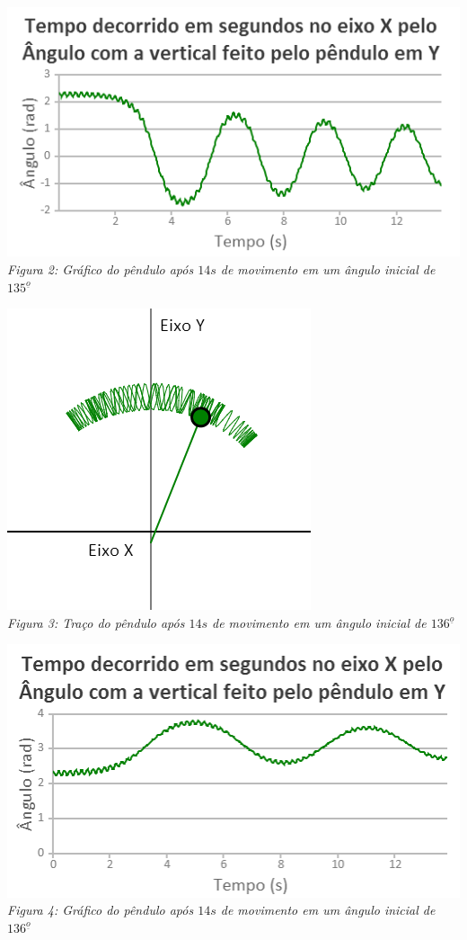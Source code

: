 \documentclass[13pt,a4paper]{report}
\begin{document}
\begin{center}
\includegraphics[scale=0.9]{figuras/graficopenduloimpulsionado135.png}
\\
\textit{Figura 2: Gráfico do pêndulo após $14 s$ de movimento em um ângulo inicial
de $135^{\underline{o}}$ }
\end{center}

\begin{center}
\includegraphics[scale=0.9]{figuras/tracopenduloimpulsionado136.png}
\\
\textit{Figura 3: Traço do pêndulo após $14 s$ de movimento em um ângulo inicial
de $136^{\underline{o}}$ }
\end{center}
\clearpage


\begin{center}
\includegraphics[scale=0.9]{figuras/graficopenduloimpulsionado136.png}
\\
\textit{Figura 4: Gráfico do pêndulo após $14 s$ de movimento em um ângulo inicial
de $136^{\underline{o}}$ }
\end{center}
\clearpage
\end{document}
